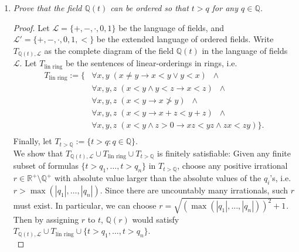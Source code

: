 \documentclass{article}
\begin{document}
\begin{enumerate}[label={\bf Q\arabic*:}]
\begin{proof}
      Then $F(\sqrt{a})$ will be formally real (Lemma 13.15). But since $F$
      is real-closed, $F(\sqrt{a})$ cannot properly extend $F$, which
      implies that $\sqrt{a}$ is contained in $F$, and thus $a$ is a square
      in $F$. On the other hand, if $-a$ is a sum of squares, then
      exchanging the roles of $a$ and $-a$ in the above argument, we will
      get $-a$ is a square in $F$.
    \end{proof}

  \item \it Prove that the field $\mathbb{Q}(t)$ can be ordered so that
    $t>q$ for any $q\in\mathbb{Q}$.

    \begin{proof}
      Let $\mathcal{L}=\{+,-,\cdot,0,1\}$ be the language of fields, and
      $\mathcal{L}'=\{+,-,\cdot,0,1,<\}$ be the extended language of ordered
      fields. Write $T_{\mathbb{Q}(t),\mathcal{L}}$ as the complete
      diagram of the field $\mathbb{Q}(t)$ in the language
      of fields $\mathcal{L}$. Let $T_{\text{lin ring}}$ be the sentences of
      linear-orderings in rings, i.e.
      \begin{align*}
        T_{\text{lin ring}}:=\{ &\forall x,y\; (x\neq y\rightarrow x<y\vee
          y<x) \;\; \wedge \\
        &\forall x,y,z\; (x<y\wedge y<z\rightarrow x<z) \;\; \wedge \\
        &\forall x,y,z\; (x<y\rightarrow x\not>y) \;\; \wedge \\
        &\forall x,y,z\; (x<y\rightarrow x+z<y+z) \;\; \wedge \\
        &\forall x,y,z\; (x<y\wedge z>0\rightarrow xz<yz\wedge zx<zy)\}. \\
      \end{align*}
      Finally, let $T_{t>\mathbb{Q}}:= \{t>q:q\in\mathbb{Q}\}$. \\

      We show that $T_{\mathbb{Q}(t),\mathcal{L}}\cup
      T_{\text{lin ring}}\cup T_{t>\mathbb{Q}}$ is finitely satisfiable: Given
      any finite subset of formulas $\{t>q_1,\ldots,t>q_n\}$ in
      $T_{t>\mathbb{Q}}$, choose any positive irrational
      $r\in\mathbb{R}^+\setminus\mathbb{Q}^+$ with absolute value larger
      than the absolute values of the $q_i$'s, i.e.
      $r>\max(|q_1|,\ldots,|q_n|)$. Since there are uncountably many
      irrationals, such $r$ must exist. In particular, we can choose
      $r=\sqrt{(\max(|q_1|,\ldots,|q_n|))^2+1}$. Then by assigning $r$ to
      $t$, $\mathbb{Q}(r)$ would satisfy $T_{\mathbb{Q}(t),\mathcal{L}}\cup
      T_{\text{lin ring}}\cup \{t>q_1,\ldots,t>q_n\}$. \\


\end{proof}
\end{enumerate}
\end{document}
